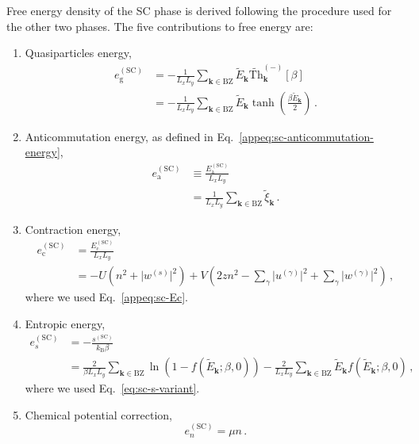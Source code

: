 \begin{tabproof}
	
	Free energy density of the SC phase is derived following the procedure used for the other two phases. The five contributions to free energy are:
	\begin{enumerate}
		\item Quasiparticles energy,
		\[
		\begin{aligned}
			e_\mathrm{g}^{(\mathrm{SC})} &= -\frac{1}{L_x L_y} \sum_{\mathbf{k} \in \mathrm{BZ}} \tilde{E}_\mathbf{k} \tilde{\mathrm{Th}}_\mathbf{k}^{(-)}[\beta] \\
			&= -\frac{1}{L_x L_y} \sum_{\mathbf{k} \in \mathrm{BZ}} \tilde{E}_\mathbf{k} \tanh(\frac{\beta \tilde{E}_\mathbf{k}}{2}) \, .
		\end{aligned}
		\]
		\item Anticommutation energy, as defined in Eq.~\eqref{appeq:sc-anticommutation-energy},
		\[
		\begin{aligned}
			e_\mathrm{a}^{(\mathrm{SC})} &\equiv \frac{E_\mathrm{a}^{(\mathrm{SC})}}{L_x L_y} \\
			&= \frac{1}{L_x L_y} \sum_{\mathbf{k} \in \mathrm{BZ}} \tilde{\xi}_\mathbf{k} \, .
		\end{aligned}
		\]
		\item Contraction energy,
		\[
		\begin{aligned}
			e_\mathrm{c}^{(\mathrm{SC})} &= \frac{E_\mathrm{c}^{(\mathrm{SC})}}{L_x L_y} \\
			&= -U \left(
			n^2 + \big|
			w^{(s)}
			\big|^2
			\right) + V \left(
			2zn^2 - \sum_\gamma \big|
			u^{(\gamma)}
			\big|^2 + \sum_\gamma \big|
			w^{(\gamma)}
			\big|^2
			\right) \, ,
		\end{aligned}
		\]
		where we used Eq.~\eqref{appeq:sc-Ec}.
		\item Entropic energy,
		\[
		\begin{aligned}
			e_s^{(\mathrm{SC})} &= - \frac{s^{(\mathrm{SC})}}{k_\mathrm{B}\beta} \\
			&= \frac{2}{\beta L_x L_y} \sum_{\mathbf{k}\in\mathrm{BZ}} \ln \left(
			1- f( \tilde{E}_\mathbf{k}; \beta,0) 
			\right) - \frac{2}{L_x L_y} \sum_{\mathbf{k}\in\mathrm{BZ}} \tilde{E}_\mathbf{k} f(\tilde{E}_\mathbf{k}; \beta,0) \, ,
		\end{aligned}
		\]
		where we used Eq.~\eqref{eq:sc-s-variant}.
		\item Chemical potential correction,
		\[
		e_n^{(\mathrm{SC})} = \mu n \, .
\]
\end{enumerate}
\end{tabproof}
